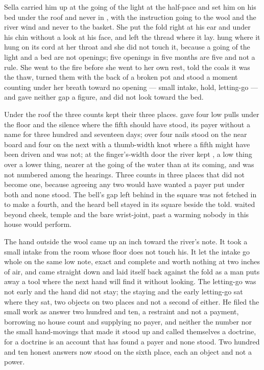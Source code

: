 Sella carried him up at the going of the light at the half-pace and set him on his bed under the roof and never in , with the instruction going to the wool and the river wind and never to the basket. She put the fold right at his ear and under his chin without a look at his face, and left the thread where it lay.  hung where it hung on its cord at her throat and she did not touch it, because a going of the light and a bed are not openings; five openings in five months are five and not a rule. She went to the fire before she went to her own rest, told the coals it was the thaw, turned them with the back of a broken pot and stood a moment counting under her breath toward no opening --- small intake, hold, letting-go --- and gave neither gap a figure, and did not look toward the bed.

Under the roof the three counts kept their three places.  gave four low pulls under the floor and the silence where the fifth should have stood, its payer without a name for three hundred and seventeen days; over  four nails stood on the near board and four on the next with a thumb-width knot where a fifth might have been driven and was not; at the finger's-width door the river kept , a low thing over a lower thing, nearer at the going of the water than at its coming, and was not numbered among the hearings. Three counts in three places that did not become one, because agreeing any two would have wanted a payer put under both and none stood. The bell's gap left behind in the square was not fetched in to make a fourth, and the heard bell stayed in its square beside the told.  waited beyond cheek, temple and the bare wrist-joint, past a warming nobody in this house would perform.

The hand outside the wool came up an inch toward the river's note. It took a small intake from the room whose floor does not touch his. It let the intake go whole on the same low note, exact and complete and worth nothing at two inches of air, and came straight down and laid itself back against the fold as a man puts away a tool where the next hand will find it without looking. The letting-go was not early and the hand did not stay; the staying and the early letting-go sat where they sat, two objects on two places and not a second of either. He filed the small work as answer two hundred and ten, a restraint and not a payment, borrowing no house count and supplying no payer, and neither the number nor the small hand-movings that made it stood up and called themselves a doctrine, for a doctrine is an account that has found a payer and none stood. Two hundred and ten honest answers now stood on the sixth place, each an object and not a power.

